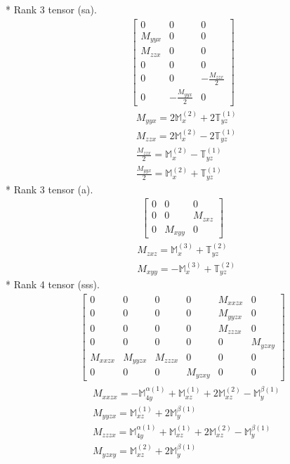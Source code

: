 \documentclass[fleqn,8pt,landscape]{jsarticle}
\begin{document}
* Rank 3 tensor (sa).
\begin{align*}
\begin{bmatrix} 0 & 0 & 0 \\ M_{yyx} & 0 & 0 \\ M_{zzx} & 0 & 0 \\ 0 & 0 & 0 \\ 0 & 0 & - \frac{M_{zzx}}{2} \\ 0 & - \frac{M_{yyx}}{2} & 0 \end{bmatrix}
\end{align*}
\begin{align*}
& M_{yyx} = 2 \mathbb{M}_{x}^{(2)} + 2 \mathbb{T}_{yz}^{(1)} \\
& M_{zzx} = 2 \mathbb{M}_{x}^{(2)} - 2 \mathbb{T}_{yz}^{(1)} \\
& \frac{M_{zzx}}{2} = \mathbb{M}_{x}^{(2)} - \mathbb{T}_{yz}^{(1)} \\
& \frac{M_{yyx}}{2} = \mathbb{M}_{x}^{(2)} + \mathbb{T}_{yz}^{(1)}
\end{align*}
* Rank 3 tensor (a).
\begin{align*}
\begin{bmatrix} 0 & 0 & 0 \\ 0 & 0 & M_{zxz} \\ 0 & M_{xyy} & 0 \end{bmatrix}
\end{align*}
\begin{align*}
& M_{zxz} = \mathbb{M}_{x}^{(3)} + \mathbb{T}_{yz}^{(2)} \\
& M_{xyy} = - \mathbb{M}_{x}^{(3)} + \mathbb{T}_{yz}^{(2)}
\end{align*}
* Rank 4 tensor (sss).
\begin{align*}
\begin{bmatrix} 0 & 0 & 0 & 0 & M_{xxzx} & 0 \\ 0 & 0 & 0 & 0 & M_{yyzx} & 0 \\ 0 & 0 & 0 & 0 & M_{zzzx} & 0 \\ 0 & 0 & 0 & 0 & 0 & M_{yzxy} \\ M_{xxzx} & M_{yyzx} & M_{zzzx} & 0 & 0 & 0 \\ 0 & 0 & 0 & M_{yzxy} & 0 & 0 \end{bmatrix}
\end{align*}
\begin{align*}
& M_{xxzx} = - \mathbb{M}_{4y}^{\alpha(1)} + \mathbb{M}_{xz}^{(1)} + 2 \mathbb{M}_{xz}^{(2)} - \mathbb{M}_{y}^{\beta(1)} \\
& M_{yyzx} = \mathbb{M}_{xz}^{(1)} + 2 \mathbb{M}_{y}^{\beta(1)} \\
& M_{zzzx} = \mathbb{M}_{4y}^{\alpha(1)} + \mathbb{M}_{xz}^{(1)} + 2 \mathbb{M}_{xz}^{(2)} - \mathbb{M}_{y}^{\beta(1)} \\
& M_{yzxy} = \mathbb{M}_{xz}^{(2)} + 2 \mathbb{M}_{y}^{\beta(1)}
\end{align*}
\end{document}
